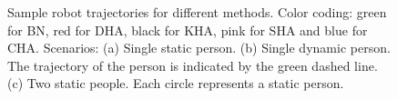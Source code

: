 \begin{figure}
{}%
%
%

\caption{Sample robot trajectories for different methods. Color coding: green for BN, red for DHA, black for KHA, pink for SHA and blue for CHA. Scenarios: (a) Single static person. (b) Single dynamic person. The trajectory of the person is indicated by the green dashed line. (c) Two static people. Each circle represents a static person.
}
\label{fig:trajs}
\end{figure}

